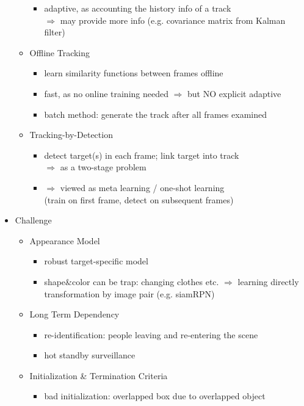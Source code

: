 \begin{itemize}
\begin{itemize}
\begin{itemize}
		\item adaptive, as accounting the history info of a track \\
		$\Rightarrow$ may provide more info (e.g. covariance matrix from Kalman filter)
		\end{itemize}
	\item Offline Tracking
		\begin{itemize}
		\item learn similarity functions between frames offline
		\item fast, as no online training needed $\Rightarrow$ but NO explicit adaptive
		\item batch method: generate the track after all frames examined
		\end{itemize}
	\item Tracking-by-Detection
		\begin{itemize}
		\item detect target(s) in each frame; link target into track \\
		$\Rightarrow$ as a two-stage problem
		\item $\Rightarrow$ viewed as meta learning / one-shot learning \\
		(train on first frame, detect on subsequent frames)
		\end{itemize}
	\end{itemize}
\item Challenge
	\begin{itemize}
	\item Appearance Model
		\begin{itemize}
		\item robust target-specific model
		\item shape\&color can be trap: changing clothes etc.
		$\Rightarrow$ learning directly transformation by image pair (e.g. siamRPN)
		\end{itemize}
	\item Long Term Dependency
		\begin{itemize}
		\item re-identification: people leaving and re-entering the scene
		\item hot standby surveillance
		\end{itemize}
	\item Initialization \& Termination Criteria
		\begin{itemize}
		\item bad initialization: overlapped box due to overlapped object \\

\end{itemize}
\end{itemize}
\end{itemize}

